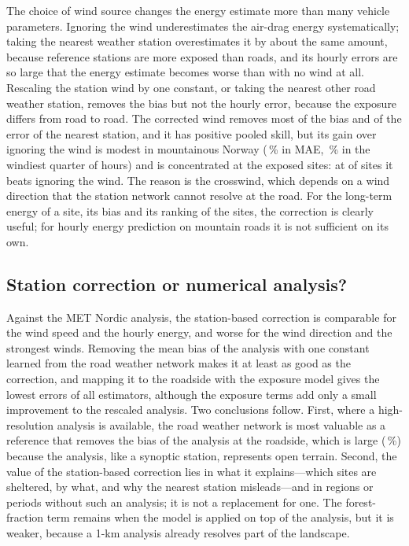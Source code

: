 The choice of wind source changes the energy estimate more than many vehicle parameters. Ignoring the wind underestimates the air-drag energy systematically; taking the nearest weather station overestimates it by about the same amount, because reference stations are more exposed than roads, and its hourly errors are so large that the energy estimate becomes worse than with no wind at all. Rescaling the station wind by one constant, or taking the nearest other road weather station, removes the bias but not the hourly error, because the exposure differs from road to road. The corrected wind removes most of the bias and of the error of the nearest station, and it has positive pooled skill, but its gain over ignoring the wind is modest in mountainous Norway (\enMaeGainNo\,\% in MAE, \enCondGainNo\,\% in the windiest quarter of hours) and is concentrated at the exposed sites: at \enStGainNoCor{} of \enNoStations{} sites it beats ignoring the wind. The reason is the crosswind, which depends on a wind direction that the station network cannot resolve at the road. For the long-term energy of a site, its bias and its ranking of the sites, the correction is clearly useful; for hourly energy prediction on mountain roads it is not sufficient on its own.

\subsection{Station correction or numerical analysis?}
Against the MET Nordic analysis, the station-based correction is comparable for the wind speed and the hourly energy, and worse for the wind direction and the strongest winds. Removing the mean bias of the analysis with one constant learned from the road weather network makes it at least as good as the correction, and mapping it to the roadside with the exposure model gives the lowest errors of all estimators, although the exposure terms add only a small improvement to the rescaled analysis. Two conclusions follow. First, where a high-resolution analysis is available, the road weather network is most valuable as a reference that removes the bias of the analysis at the roadside, which is large (\noSpdBiasMnhMn\,\%) because the analysis, like a synoptic station, represents open terrain. Second, the value of the station-based correction lies in what it explains---which sites are sheltered, by what, and why the nearest station misleads---and in regions or periods without such an analysis; it is not a replacement for one. The forest-fraction term remains when the model is applied on top of the analysis, but it is weaker, because a 1-km analysis already resolves part of the landscape.

